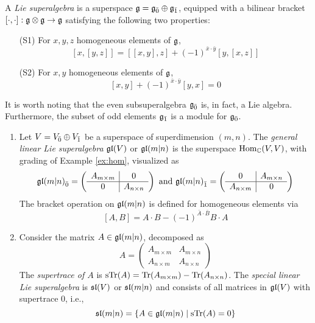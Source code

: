 \begin{definition}
  A \emph{Lie superalgebra} is a superspace $\g = \even{\g} \oplus \odd{\g}$, equipped with a bilinear bracket $[\cdot,\cdot]: \g \otimes \g \to \g$ satisfying the following two properties:
  \begin{enumerate}
  \item [(S1)] For $x,y,z$ homogeneous elements of $\g$,
    \[
      [x,[y,z]] = [[x,y],z] + (-1)^{\bar x \cdot \bar y} [y, [x,z]]
    \]
    
  \item [(S2)] For $x,y$ homogeneous elements of $\g$,
    \[
      [x,y] + (-1)^{\bar x \cdot \bar y} [y,x] = 0
    \]
    
  \end{enumerate}
\end{definition}

It is worth noting that the even subsuperalgebra $\even{\g}$ is, in fact, a Lie algebra. Furthermore, the subset of odd elements $\odd{\g}$ is a module for $\even{\g}$.

\begin{example}
  \begin{enumerate}
    \item Let $V = \even{V} \oplus \odd{V}$ be a superspace of superdimension $(m,n)$. The \emph{general linear Lie superalgebra} $\gl(V)$ or $\gl(m|n)$ is the superspace $\Hom_\CC(V,V)$, with grading of Example \ref{ex:hom}, visualized as
  \[
    \even{\gl(m|n)} =
    \left(
      \begin{array}{c|c}
        A_{m \times m} & 0 \\
        \hline
        0 & A_{n \times n}
      \end{array}
    \right)
    \text{ and }
    \odd{\gl(m|n)} =
    \left(
      \begin{array}{c|c}
        0 & A_{m \times n} \\
        \hline
        A_{n \times m} & 0
      \end{array}
    \right)
  \]
  The bracket operation on $\gl(m|n)$ is defined for homogeneous elements via
  \[
    [A,B] = A \cdot B - (-1)^{\bar A \cdot \bar B} B \cdot A
  \]
  \item Consider the matrix $A \in \gl(m|n)$, decomposed as
  \[
    A = 
    \left(
      \begin{array}{c|c}
        A_{m \times m} & A_{m \times n} \\
        \hline
        A_{n \times m} & A_{n \times n}
      \end{array}
    \right)
  \]
  The \emph{supertrace of $A$} is $\sTr(A) = \Tr(A_{m \times m}) - \Tr(A_{n \times n})$. The \emph{special linear Lie superalgebra} is $\sl(V)$ or $\sl(m|n)$ and consists of all matrices in $\gl(V)$ with supertrace 0, i.e.,
  \[
    \sl(m|n) = \left\{ A \in \gl(m|n) \mid \sTr(A) = 0 \right\}
  \]
\end{enumerate}
\end{example}

